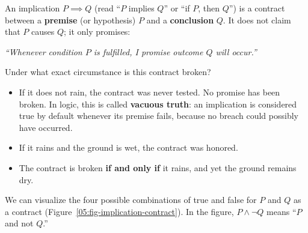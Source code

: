 An implication $P \implies Q$ (read ``$P$ implies $Q$'' or ``if $P$, then $Q$'') is a contract between a \textbf{premise} (or hypothesis) $P$ and a \textbf{conclusion} $Q$. It does not claim that $P$ causes $Q$; it only promises:
\begin{center}
\itshape ``Whenever condition $P$ is fulfilled, I promise outcome $Q$ will occur.''
\end{center}
Under what exact circumstance is this contract broken? 
\begin{itemize}
\item If it does not rain, the contract was never tested. No promise has been broken. In logic, this is called \textbf{vacuous truth}: an implication is considered true by default whenever its premise fails, because no breach could possibly have occurred.
\item If it rains and the ground is wet, the contract was honored.
\item The contract is broken \textbf{if and only if} it rains, and yet the ground remains dry.
\end{itemize}

We can visualize the four possible combinations of true and false for $P$ and $Q$ as a contract (Figure~\ref{05:fig-implication-contract}). In the figure, $P \land \neg Q$ means ``$P$ and not $Q$.''

